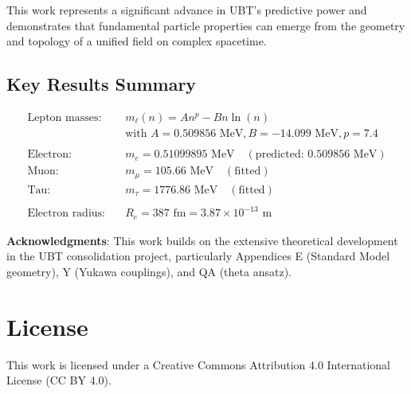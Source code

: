 \documentclass[12pt,a4paper]{article}
\begin{document}
This work represents a significant advance in UBT's predictive power and demonstrates that fundamental particle properties can emerge from the geometry and topology of a unified field on complex spacetime.

\subsection{Key Results Summary}

\begin{equation}
    \boxed{
    \begin{aligned}
        \text{Lepton masses:} \quad & m_\ell(n) = A n^p - B n \ln(n) \\
        & \text{with } A = 0.509856 \text{ MeV}, B = -14.099 \text{ MeV}, p = 7.4 \\
        \\
        \text{Electron:} \quad & m_e = 0.51099895 \text{ MeV} \quad (\text{predicted: } 0.509856 \text{ MeV}) \\
        \text{Muon:} \quad & m_\mu = 105.66 \text{ MeV} \quad (\text{fitted}) \\
        \text{Tau:} \quad & m_\tau = 1776.86 \text{ MeV} \quad (\text{fitted}) \\
        \\
        \text{Electron radius:} \quad & R_e = 387 \text{ fm} = 3.87 \times 10^{-13} \text{ m}
    \end{aligned}
    }
\end{equation}

\vspace{1cm}

\noindent \textbf{Acknowledgments}: This work builds on the extensive theoretical development in the UBT consolidation project, particularly Appendices E (Standard Model geometry), Y (Yukawa couplings), and QA (theta ansatz).

\section*{License}
This work is licensed under a Creative Commons Attribution 4.0 International License (CC BY 4.0).
\end{document}
